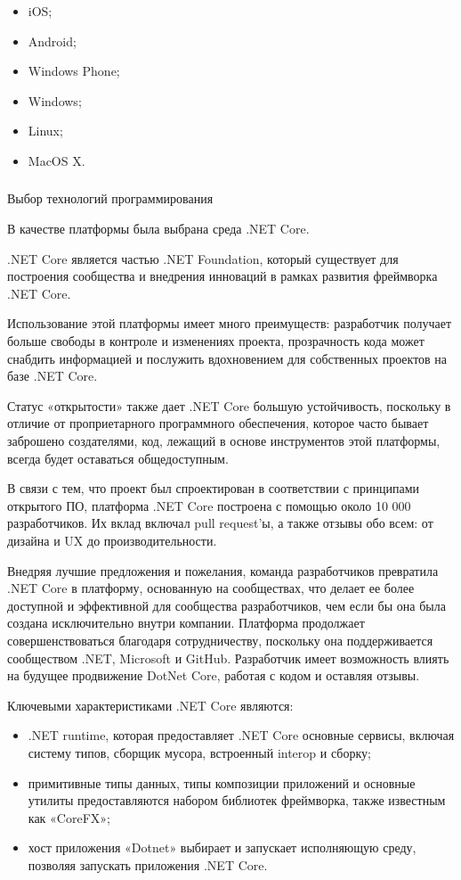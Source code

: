 \begin{itemize}
	\item iOS;
	\item Android;
	\item Windows Phone;
	\item Windows;
	\item Linux;
	\item MacOS X.
\end{itemize}

\subsubsection{} Выбор технологий программирования
\label{sec:analysis:specification:language}

В качестве платформы была выбрана среда .NET Core.

.NET Core является частью .NET Foundation, который существует для построения сообщества и внедрения инноваций в рамках развития фреймворка .NET Core.

Использование этой платформы имеет много преимуществ: разработчик получает больше свободы в контроле и изменениях проекта, прозрачность кода может снабдить информацией и послужить вдохновением для собственных проектов на базе .NET Core.

Статус «открытости» также дает .NET Core большую устойчивость, поскольку в отличие от проприетарного программного обеспечения, которое часто бывает заброшено создателями, код, лежащий в основе инструментов этой платформы, всегда будет оставаться общедоступным.

В связи с тем, что проект был спроектирован в соответствии с принципами открытого ПО, платформа .NET Core построена с помощью около 10 000 разработчиков. Их вклад включал pull request’ы, а также отзывы обо всем: от дизайна и UX до производительности.

Внедряя лучшие предложения и пожелания, команда разработчиков превратила .NET Core в платформу, основанную на сообществах, что делает ее более доступной и эффективной для сообщества разработчиков, чем если бы она была создана исключительно внутри компании. Платформа продолжает совершенствоваться благодаря сотрудничеству, поскольку она поддерживается сообществом .NET, Microsoft и GitHub. Разработчик имеет возможность влиять на будущее продвижение DotNet Core, работая с кодом и оставляя отзывы.

Ключевыми характеристиками .NET Core являются:

\begin{itemize}
	\item .NET runtime, которая предоставляет .NET Core основные сервисы, включая систему типов, сборщик мусора, встроенный interop и сборку;
	\item примитивные типы данных, типы композиции приложений и основные утилиты предоставляются набором библиотек фреймворка, также известным как «CoreFX»;
	\item хост приложения «Dotnet» выбирает и запускает исполняющую среду, позволяя запускать приложения .NET Core.
\end{itemize}

